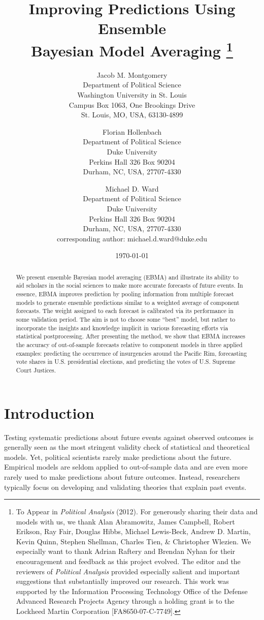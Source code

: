 \documentclass[12pt,fullpage,endnotes]{article}
\title{Improving Predictions Using Ensemble \\ Bayesian Model
  Averaging \thanks{To Appear in {\em Political Analysis} (2012). For generously sharing their data and models with
    us, we thank Alan Abramowitz, James Campbell, Robert Erikson, Ray
    Fair, Douglas Hibbs, Michael Lewis-Beck, Andrew D. Martin, Kevin
    Quinn, Stephen Shellman, Charles Tien, \& Christopher Wlezien.
    We especially want to thank Adrian Raftery and Brendan Nyhan for their
    encouragement and feedback as this project evolved. The editor and the reviewers of {\em Political Analysis}
    provided especially salient and important suggestions that substantially improved our research.
   This work was supported by the Information Processing Technology Office of the
    Defense Advanced Research Projects Agency through a
    holding grant is to the Lockheed Martin Corporation [FA8650-07-C-7749].}}
\author{
Jacob M. Montgomery\\
	Department of Political Science\\
	Washington University in St. Louis\\
	Campus Box 1063, One Brookings Drive\\
	St. Louis, MO, USA, 63130-4899 
	\and
Florian Hollenbach  \\
	Department of Political Science\\
	Duke University\\
	Perkins Hall 326 Box 90204\\
	Durham, NC, USA, 27707-4330
	\and
Michael D. Ward\\
	Department of Political Science\\
	Duke University\\
	Perkins Hall 326 Box 90204\\
	Durham, NC, USA, 27707-4330\\
	corresponding author: michael.d.ward@duke.edu
}
\date{\today}
\begin{document}
\maketitle
\thispagestyle{empty}
\clearpage
\pagestyle{myheadings}
\newpage

\thispagestyle{empty}


\begin{abstract}
 We present ensemble Bayesian model averaging (EBMA) and illustrate
  its ability to aid scholars in the social sciences to make more
  accurate forecasts of future events.  In essence, EBMA improves
  prediction by pooling information from multiple forecast models to
  generate ensemble predictions similar to a weighted average of
  component forecasts. The weight assigned to each forecast is
  calibrated via its performance in some validation period. The aim is
  not to choose some ``best'' model, but rather to incorporate the
  insights and knowledge implicit in various forecasting efforts via
  statistical postprocessing.  After presenting the method, we show
  that EBMA increases the accuracy of out-of-sample forecasts relative
  to component models in three applied examples: predicting the
  occurrence of insurgencies around the Pacific Rim, forecasting vote
  shares in U.S. presidential elections, and predicting the votes of
  U.S. Supreme Court Justices.
\end{abstract}


\setcounter{page}{1}

\section{Introduction}
Testing systematic predictions about future events against observed
outcomes is generally seen as the most stringent validity check of
statistical and theoretical models.  Yet, political scientists rarely
make predictions about the future.  Empirical models are seldom
applied to out-of-sample data and are even more rarely used to make
predictions about future outcomes. Instead, researchers typically
focus on developing and validating theories that explain past events.
\end{document}
